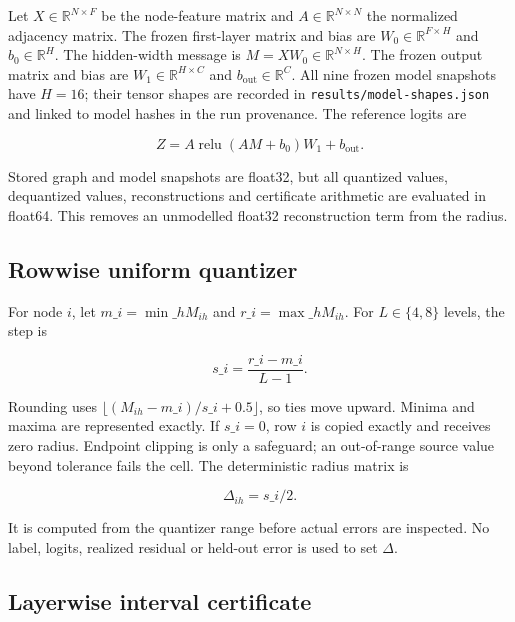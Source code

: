 \documentclass{article}
\begin{document}
\label{sec:frozen\_graph\_computation}

Let \(X\in\mathbb R^{N\times F}\) be the node-feature matrix and \(A\in\mathbb R^{N\times N}\) the normalized adjacency matrix. The frozen first-layer matrix and bias are \(W_0\in\mathbb R^{F\times H}\) and \(b_0\in\mathbb R^H\). The hidden-width message is \(M=XW_0\in\mathbb R^{N\times H}\). The frozen output matrix and bias are \(W_1\in\mathbb R^{H\times C}\) and \(b_{\mathrm{out}}\in\mathbb R^C\). All nine frozen model snapshots have \(H=16\); their tensor shapes are recorded in \texttt{results/model-shapes.json} and linked to model hashes in the run provenance. The reference logits are

\[
Z=A\operatorname{relu}(AM+b_0)W_1+b_{\mathrm{out}}.
\]

Stored graph and model snapshots are float32, but all quantized values, dequantized values, reconstructions and certificate arithmetic are evaluated in float64. This removes an unmodelled float32 reconstruction term from the radius.

\subsection{Rowwise uniform quantizer}

\label{sec:rowwise\_uniform\_quantizer}

For node \(i\), let \(m\_i=\min\_h M_{ih}\) and \(r\_i=\max\_h M_{ih}\). For \(L\in\{4,8\}\) levels, the step is

\[
s\_i=\frac{r\_i-m\_i}{L-1}.
\]

Rounding uses \(\lfloor (M_{ih}-m\_i)/s\_i+0.5\rfloor\), so ties move upward. Minima and maxima are represented exactly. If \(s\_i=0\), row \(i\) is copied exactly and receives zero radius. Endpoint clipping is only a safeguard; an out-of-range source value beyond tolerance fails the cell. The deterministic radius matrix is

\[
\Delta_{ih}=s\_i/2.
\]

It is computed from the quantizer range before actual errors are inspected. No label, logits, realized residual or held-out error is used to set \(\Delta\).

\subsection{Layerwise interval certificate}

\label{sec:layerwise\_interval\_certificate}
\end{document}
